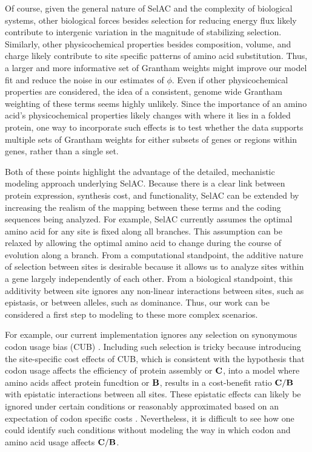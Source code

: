 \documentclass[12pt,letterpaper,fleqn]{article}
\newcommand{\Cost}{\ensuremath{\text{\textbf{C}}}\xspace}
\newcommand{\Func}{\ensuremath{\text{\textbf{B}}}\xspace}
\newcommand{\selac}{SelAC\xspace}
\begin{document}
Of course, given the general nature of \selac and the complexity of biological systems, other biological forces besides selection for reducing energy flux likely contribute to intergenic variation in the magnitude of stabilizing selection. 
Similarly, other physicochemical properties besides composition, volume, and charge likely contribute to site specific patterns of amino acid substitution. 
Thus, a larger and more informative set of Grantham weights might improve our model fit and reduce the noise in our estimates of $\phi$. 
Even if other physicochemical properties are considered, the idea of a consistent, genome wide Grantham weighting of these terms seems highly unlikely. 
Since the importance of an amino acid's physicochemical properties likely changes with where it lies in a folded protein, one way to incorporate such effects is to test whether the data supports multiple sets of Grantham weights for either subsets of genes or regions within genes, rather than a single set.

Both of these points highlight the advantage of the detailed, mechanistic modeling approach underlying \selac. 
Because there is a clear link between protein expression, synthesis cost, and functionality, \selac can be extended by increasing the realism of the mapping between these terms and the coding sequences being analyzed. 
For example, \selac currently assumes the optimal amino acid for any site is fixed along all branches. 
This assumption can be relaxed by allowing the optimal amino acid to change during the course of evolution along a branch.
From a computational standpoint, the additive nature of selection between sites is desirable because it allows us to analyze sites within a gene largely independently of each other.
From a biological standpoint, this additivity between site ignores any non-linear interactions between sites, such as epistasis, or between alleles, such as dominance. 
Thus, our work can be considered a first step to modeling to these more complex scenarios. 

For example, our current implementation ignores any selection on synonymous codon usage bias (CUB) \citep[c.f.~][]{YangAndNielsen2008,PouyetEtAl2016}. 
Including such selection is tricky because introducing the site-specific cost effects of CUB, which is consistent with the hypothesis that codon usage affects the efficiency of protein assembly or \Cost, into a model where amino acids affect protein funcdtion or \Func, results in a cost-benefit ratio $\Cost/\Func$ with epistatic interactions between all sites. 
These epistatic effects can likely be ignored under certain conditions or reasonably approximated based on an expectation of codon specific costs \citep[e.g.~][]{KubatkoEtAl2016}. 
Nevertheless, it is difficult to see how one could identify such conditions without modeling the way in which codon and amino acid usage affects $\Cost/\Func$.
\end{document}
